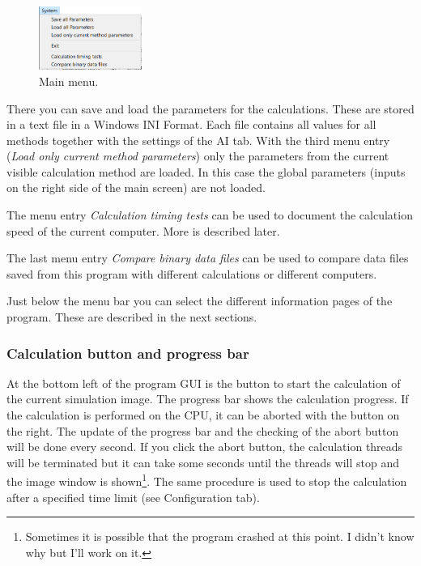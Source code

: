 \documentclass[11pt]{article} %
\begin{document}
\begin{figure}
  \begin{center}
    \includegraphics[width=0.30\textwidth]{main-menu.png}
  \end{center}
 \caption{Main menu.}
 \label{fig:mainmenu}
\end{figure}
There you can save and load the parameters for the calculations. These are stored in a text file in a Windows INI Format. Each file contains all values for all methods together with the settings of the AI tab. With the third menu entry ({\it Load only current method parameters}) only the parameters from the current visible calculation method are loaded. In this case the global parameters (inputs on the right side of the main screen) are not loaded.

The menu entry {\it Calculation timing tests} can be used to document the calculation speed of the current computer. More is described later.

The last menu entry {\it Compare binary data files} can be used to compare data files saved from this program with different calculations or different computers.

Just below the menu bar you can select the different information pages of the program. These are described in the next sections.

\subsubsection{Calculation button and progress bar}

At the bottom left of the program GUI is the button to start the calculation of the current simulation image. The progress bar shows the calculation progress. If the calculation is performed on the CPU, it can be aborted with the button on the right. The update of the progress bar and the checking of the abort button will be done every second. If you click the abort button, the calculation threads will be terminated but it can take some seconds until the threads will stop and the image window is shown\footnote{Sometimes it is possible that the program crashed at this point. I didn't know why but I'll work on it.}. The same procedure is used to stop the calculation after a specified time limit (see Configuration tab).
\end{document}
